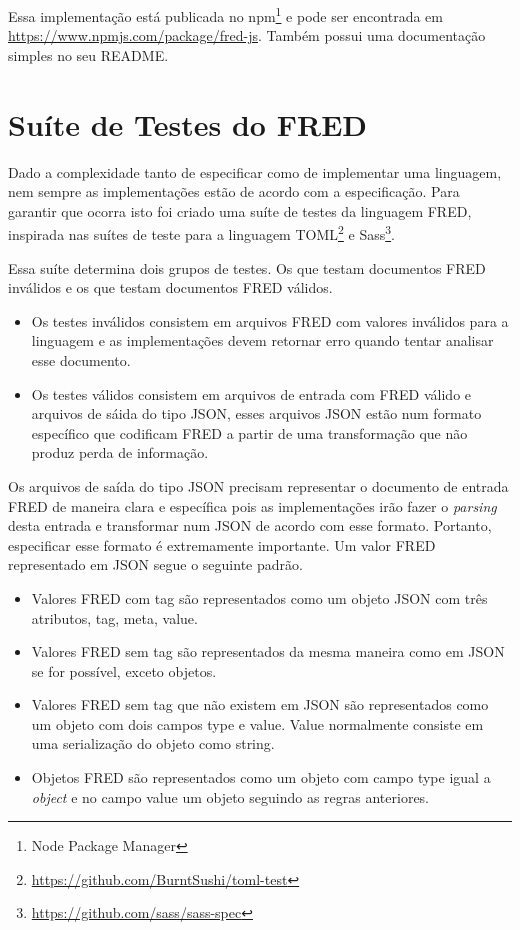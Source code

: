 Essa implementação está publicada no npm\footnote{Node Package Manager}
e pode ser encontrada em \url{https://www.npmjs.com/package/fred-js}. Também possui uma
documentação simples no seu README.

\section{Suíte de Testes do FRED}

Dado a complexidade tanto de especificar como de implementar uma linguagem, nem sempre 
as implementações estão de acordo com a especificação. Para garantir que ocorra isto foi criado
uma suíte de testes da linguagem FRED, inspirada nas suítes de teste
para a linguagem TOML\footnote{\url{https://github.com/BurntSushi/toml-test}}
e Sass\footnote{\url{https://github.com/sass/sass-spec}}.

Essa suíte determina dois grupos de testes. Os que testam documentos FRED inválidos
e os que testam documentos FRED válidos.

\begin{itemize}
    \item Os testes inválidos consistem em arquivos FRED com valores inválidos para a linguagem
    e as implementações devem retornar erro quando tentar analisar esse documento.
    \item Os testes válidos consistem em arquivos de entrada com FRED válido e arquivos
    de sáida do tipo JSON, esses arquivos JSON estão num formato específico que codificam
    FRED a partir de uma transformação que não produz perda de informação.
\end{itemize}

Os arquivos de saída do tipo JSON precisam representar o documento de entrada FRED de maneira
clara e específica pois as implementações irão fazer o \textit{parsing} desta entrada e transformar
num JSON de acordo com esse formato. Portanto, especificar esse formato é extremamente importante. Um valor FRED
representado em JSON segue o seguinte padrão.

\begin{itemize}
    \item Valores FRED com tag são representados como um objeto JSON com três atributos, tag, meta, value.
    \item Valores FRED sem tag são representados da mesma maneira como em JSON se for possível, exceto objetos.
    \item Valores FRED sem tag que não existem em JSON são representados como um objeto com dois campos type e value.
    Value normalmente consiste em uma serialização do objeto como string.
    \item Objetos FRED são representados como um objeto com campo type igual a \textit{object} e no campo value
    um objeto seguindo as regras anteriores.
\end{itemize}

